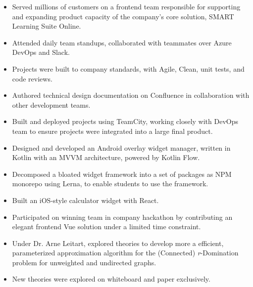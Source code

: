 \documentclass[11pt, a4paper]{article}
\begin{document}
\noindent
{
  \hfill
}
\vspace{-0.08in}
\begin{itemize}
  \item Served millions of customers on a frontend team responsible for supporting and expanding product capacity of the company's core solution, SMART Learning Suite Online.
        \vspace{-0.1in}
  \item Attended daily team standups, collaborated with teammates over Azure DevOps and Slack.
        \vspace{-0.1in}
  \item Projects were built to company standards, with Agile, Clean, unit tests, and code reviews.
        \vspace{-0.1in}
  \item Authored technical design documentation on Confluence in collaboration with other development teams.
        \vspace{-0.1in}
  \item Built and deployed projects using TeamCity, working closely with DevOps team to ensure projects were integrated into a large final product.
        \vspace{-0.1in}
  \item Designed and developed an Android overlay widget manager, written in Kotlin with an MVVM architecture, powered by Kotlin Flow.
        \vspace{-0.1in}
  \item Decomposed a bloated widget framework into a set of packages as NPM monorepo using Lerna, to enable students to use the framework.
        \vspace{-0.1in}
  \item Built an iOS-style calculator widget with React.
        \vspace{-0.1in}
  \item Participated on winning team in company hackathon by contributing an elegant frontend Vue solution under a limited time constraint.
\end{itemize}
\vspace{-0.05in}

\noindent
{
  \hfill
}

\noindent
{
  \hfill
}
\vspace{-0.08in}
\begin{itemize}
  \item Under Dr. Arne Leitart, explored theories to develop more a efficient, parameterized
        approximation algorithm for the (Connected) {\it r}-Domination problem for unweighted
        and undirected graphs.
        \vspace{-0.1in}
  \item New theories were explored on whiteboard and paper exclusively.
\end{itemize}
\vspace{-0.05in}
\end{document}
